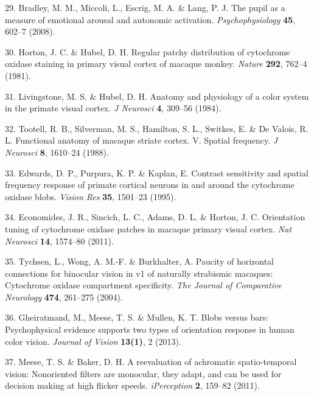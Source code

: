 \documentclass[
]{article}
\begin{document}
\leavevmode\hypertarget{ref-Bradley2008}{}%
29. Bradley, M. M., Miccoli, L., Escrig, M. A. \& Lang, P. J. The pupil as a measure of emotional arousal and autonomic activation. \emph{Psychophysiology} \textbf{45}, 602--7 (2008).

\leavevmode\hypertarget{ref-Horton1981}{}%
30. Horton, J. C. \& Hubel, D. H. Regular patchy distribution of cytochrome oxidase staining in primary visual cortex of macaque monkey. \emph{Nature} \textbf{292}, 762--4 (1981).

\leavevmode\hypertarget{ref-Livingstone1984}{}%
31. Livingstone, M. S. \& Hubel, D. H. Anatomy and physiology of a color system in the primate visual cortex. \emph{J Neurosci} \textbf{4}, 309--56 (1984).

\leavevmode\hypertarget{ref-Tootell1988}{}%
32. Tootell, R. B., Silverman, M. S., Hamilton, S. L., Switkes, E. \& De Valois, R. L. Functional anatomy of macaque striate cortex. V. Spatial frequency. \emph{J Neurosci} \textbf{8}, 1610--24 (1988).

\leavevmode\hypertarget{ref-Edwards1995}{}%
33. Edwards, D. P., Purpura, K. P. \& Kaplan, E. Contrast sensitivity and spatial frequency response of primate cortical neurons in and around the cytochrome oxidase blobs. \emph{Vision Res} \textbf{35}, 1501--23 (1995).

\leavevmode\hypertarget{ref-Economides2011}{}%
34. Economides, J. R., Sincich, L. C., Adams, D. L. \& Horton, J. C. Orientation tuning of cytochrome oxidase patches in macaque primary visual cortex. \emph{Nat Neurosci} \textbf{14}, 1574--80 (2011).

\leavevmode\hypertarget{ref-Tychsen2004}{}%
35. Tychsen, L., Wong, A. M.-F. \& Burkhalter, A. Paucity of horizontal connections for binocular vision in v1 of naturally strabismic macaques: Cytochrome oxidase compartment specificity. \emph{The Journal of Comparative Neurology} \textbf{474}, 261--275 (2004).

\leavevmode\hypertarget{ref-Gheiratmand2013}{}%
36. Gheiratmand, M., Meese, T. S. \& Mullen, K. T. Blobs versus bars: Psychophysical evidence supports two types of orientation response in human color vision. \emph{Journal of Vision} \textbf{13(1)}, 2 (2013).

\leavevmode\hypertarget{ref-Meese2011}{}%
37. Meese, T. S. \& Baker, D. H. A reevaluation of achromatic spatio-temporal vision: Nonoriented filters are monocular, they adapt, and can be used for decision making at high flicker speeds. \emph{iPerception} \textbf{2}, 159--82 (2011).
\end{document}
